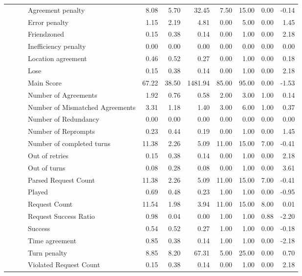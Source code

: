 \begin{tabular}{llllrrrrrrr}
 &  &  & Agreement penalty & 8.08 & 5.70 & 32.45 & 7.50 & 15.00 & 0.00 & -0.14 \\
 &  &  & Error penalty & 1.15 & 2.19 & 4.81 & 0.00 & 5.00 & 0.00 & 1.45 \\
 &  &  & Friendzoned & 0.15 & 0.38 & 0.14 & 0.00 & 1.00 & 0.00 & 2.18 \\
 &  &  & Inefficiency penalty & 0.00 & 0.00 & 0.00 & 0.00 & 0.00 & 0.00 & 0.00 \\
 &  &  & Location agreement & 0.46 & 0.52 & 0.27 & 0.00 & 1.00 & 0.00 & 0.18 \\
 &  &  & Lose & 0.15 & 0.38 & 0.14 & 0.00 & 1.00 & 0.00 & 2.18 \\
 &  &  & Main Score & 67.22 & 38.50 & 1481.94 & 85.00 & 95.00 & 0.00 & -1.53 \\
 &  &  & Number of Agreements & 1.92 & 0.76 & 0.58 & 2.00 & 3.00 & 1.00 & 0.14 \\
 &  &  & Number of Mismatched Agreements & 3.31 & 1.18 & 1.40 & 3.00 & 6.00 & 1.00 & 0.37 \\
 &  &  & Number of Redundancy & 0.00 & 0.00 & 0.00 & 0.00 & 0.00 & 0.00 & 0.00 \\
 &  &  & Number of Reprompts & 0.23 & 0.44 & 0.19 & 0.00 & 1.00 & 0.00 & 1.45 \\
 &  &  & Number of completed turns & 11.38 & 2.26 & 5.09 & 11.00 & 15.00 & 7.00 & -0.41 \\
 &  &  & Out of retries & 0.15 & 0.38 & 0.14 & 0.00 & 1.00 & 0.00 & 2.18 \\
 &  &  & Out of turns & 0.08 & 0.28 & 0.08 & 0.00 & 1.00 & 0.00 & 3.61 \\
 &  &  & Parsed Request Count & 11.38 & 2.26 & 5.09 & 11.00 & 15.00 & 7.00 & -0.41 \\
 &  &  & Played & 0.69 & 0.48 & 0.23 & 1.00 & 1.00 & 0.00 & -0.95 \\
 &  &  & Request Count & 11.54 & 1.98 & 3.94 & 11.00 & 15.00 & 8.00 & 0.01 \\
 &  &  & Request Success Ratio & 0.98 & 0.04 & 0.00 & 1.00 & 1.00 & 0.88 & -2.20 \\
 &  &  & Success & 0.54 & 0.52 & 0.27 & 1.00 & 1.00 & 0.00 & -0.18 \\
 &  &  & Time agreement & 0.85 & 0.38 & 0.14 & 1.00 & 1.00 & 0.00 & -2.18 \\
 &  &  & Turn penalty & 8.85 & 8.20 & 67.31 & 5.00 & 25.00 & 0.00 & 0.70 \\
 &  &  & Violated Request Count & 0.15 & 0.38 & 0.14 & 0.00 & 1.00 & 0.00 & 2.18 \\

\end{tabular}
